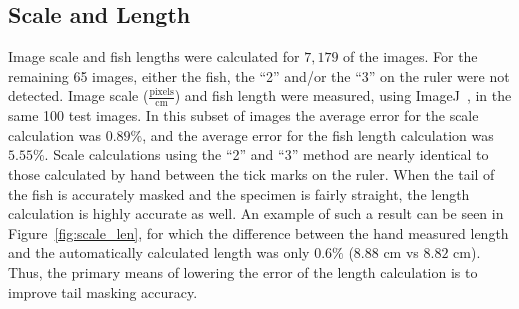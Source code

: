 \documentclass[conference]{IEEEtran}
\begin{document}
\subsection{Scale and Length}
Image scale and fish lengths were calculated for \(7,179\) of the images.
For the remaining 65 images, either the fish, the ``2'' and/or the ``3'' on the ruler were not detected.
Image scale ($\frac{\mathrm{pixels}}{\mathrm{cm}}$) and fish length were
measured, using ImageJ~\cite{imagejCite}, in the same 100  test images.
In this subset of images the average error for the scale calculation
was \(0.89\%\), and the average error for the fish length calculation was \(5.55\%\).
Scale calculations using the ``2'' and ``3'' method are nearly identical to those calculated by hand between the tick marks on the ruler. When the tail of the fish is accurately masked and the specimen is fairly straight, the length calculation is highly accurate as well. An example of such a result can be seen in Figure~\ref{fig:scale_len}, for which the difference between the hand measured length and the automatically calculated length was only \(0.6\%\) (\(8.88\) cm vs \(8.82\) cm). Thus, the primary means of lowering the error of the length calculation is to improve tail masking accuracy.

\end{document}
